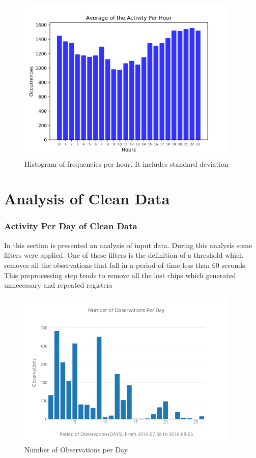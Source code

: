\documentclass[11pt,fleqn]{book} %
\begin{document}
\begin{figure}[h!]%
\centering%
\includegraphics[width=400px]{Pictures/plots/good/Morelia Hive 2histogramUnclean.png}%
\caption{Histogram of frequencies per hour. It includes standard deviation}%
\end{figure}

\chapter{Analysis of Clean Data}
\normalsize%
\subsection{Activity Per Day of Clean Data}%
\label{subsec:Activity Per Day of Clean Data}%
In this section is presented an analysis of input data. During this analysis some filters were applied. One of these filters is the definition of a threshold which removes all the observations that fall in a period of time less than 60 seconds. This preprocessing step tends to  remove all the lost chips which generated unnecessary and repeated registers %


\begin{figure}[h!]%
\centering%
\includegraphics[width=400px]{Pictures/plots/good/Morelia Hive 2observationsPerdayClean.png}%
\caption{Number of Observations per Day}%
\end{figure}
\end{document}
